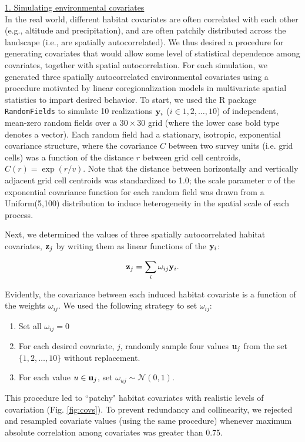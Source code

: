 \documentclass[12pt,fleqn]{article}
\begin{document}
\begin{flushleft}
\underline{1. Simulating environmental covariates} \\
In the real world, different habitat covariates are often correlated with each other (e.g., altitude and precipitation), and are often patchily distributed across the landscape (i.e., are spatially autocorrelated).  We thus desired a procedure for generating covariates that would allow some level of statistical dependence among covariates, together with spatial autocorrelation.  For each simulation, we generated three spatially autocorrelated environmental covariates using a procedure motivated by linear coregionalization models in multivariate spatial statistics \citep[e.g.][]{GoulardVoltz1992} to impart desired behavior.   To start, we used the R package \texttt{RandomFields} to simulate 10 realizations ${\bf y}_i$ ($i \in 1,2,\hdots,10$) of independent, mean-zero random fields over a $30 \times 30$ grid (where the lower case bold type denotes a vector).  Each random field had a stationary, isotropic, exponential covariance structure, where the covariance $C$ between two survey units (i.e. grid cells) was a function of the distance $r$ between grid cell centroids, $C(r)=\exp(r/v)$. Note that the distance between horizontally and vertically adjacent grid cell centroids was standardized to 1.0; the scale parameter $v$ of the exponential covariance function for each random field was drawn from a Uniform(5,100) distribution to induce heterogeneity in the spatial scale of each process.

Next, we determined the values of three spatially autocorrelated habitat covariates, ${\bf z}_j$ by writing them as linear functions of the ${\bf y}_i$:
\begin{linenomath}
\begin{equation*}
  {\bf z}_j = \sum_i \omega_{ij} {\bf y}_i.
\end{equation*}
\end{linenomath}
Evidently, the covariance between each induced habitat covariate is a function of the weights $\omega_{ij}$.  We used the following strategy to set $\omega_{ij}$:
\begin{enumerate}
  \item Set all $\omega_{ij}=0$
  \item For each desired covariate, $j$, randomly sample four values ${\bf u}_j$ from the set $\{ 1,2,\hdots,10\}$ without replacement.
  \item For each value $u \in {\bf u}_j$, set $\omega_{uj} \sim \mathcal{N}(0,1)$.
\end{enumerate} 
This procedure led to ``patchy" habitat covariates with realistic levels of covariation (Fig. \ref{fig:covs}).  To prevent redundancy and collinearity, we rejected and resampled covariate values (using the same procedure) whenever maximum absolute correlation among covariates was greater than 0.75.



\end{flushleft}
\end{document}
